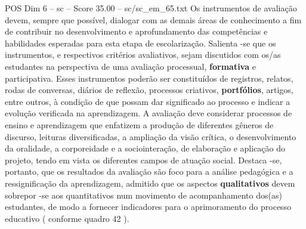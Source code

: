 \begin{textsample}{POS Dim 6 – sc – Score 35.00 – sc/sc\_em\_65.txt}
Os instrumentos de avaliação devem, sempre que possível, dialogar com as demais áreas de conhecimento a fim de contribuir no desenvolvimento e aprofundamento das competências e habilidades esperadas para esta etapa de escolarização.
Salienta -se que os instrumentos, e respectivos critérios avaliativos, sejam discutidos com os/as estudantes na perspectiva de uma avaliação processual, \textbf{formativa} e participativa.
Esses instrumentos poderão ser constituídos de registros, relatos, rodas de conversas, diários de reflexão, processos criativos, \textbf{portfólios}, artigos, entre outros, à condição de que possam dar significado ao processo e indicar a evolução verificada na aprendizagem.
A avaliação deve considerar processos de ensino e aprendizagem que enfatizem a produção de diferentes gêneros de discurso, leituras diversificadas, a ampliação da visão crítica, o desenvolvimento da oralidade, a corporeidade e a sociointeração, de elaboração e aplicação do projeto, tendo em vista os diferentes campos de atuação social.
Destaca -se, portanto, que os resultados da avaliação são foco para a análise pedagógica e a ressignificação da aprendizagem, admitido que os aspectos \textbf{qualitativos} devem sobrepor -se aos quantitativos num movimento de acompanhamento dos(as) estudantes, de modo a fornecer indicadores para o aprimoramento do processo educativo ( conforme quadro 42 ).

\end{textsample}
